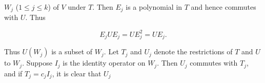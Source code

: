 \(W_{j}\) (\(1\leq j\leq k\)) of \(V\) under \(T\). Then \(E_{j}\) is a polynomial in \(T\) and hence commutes with \(U\). Thus

\[E_{j}UE_{j}=UE_{j}^{2}=UE_{j}.\]

Thus \(U(W_{j})\) is a subset of \(W_{j}\). Let \(T_{j}\) and \(U_{j}\) denote the restrictions of \(T\) and \(U\) to \(W_{j}\). Suppose \(I_{j}\) is the identity operator on \(W_{j}\). Then \(U_{j}\) commutes with \(T_{j}\), and if \(T_{j}=c_{j}I_{j}\), it is clear that \(U_{j}\) 